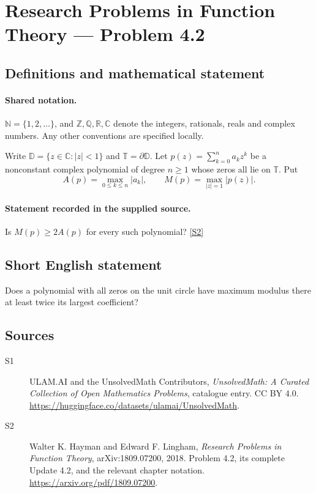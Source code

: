 \documentclass[11pt]{book}
\newcommand{\sref}[2]{\hyperlink{source:#1:#2}{[S#2]}}
\begin{document}
\section{Research Problems in Function Theory — Problem 4.2}\label{statement}

\subsection{Definitions and mathematical statement}

\paragraph{Shared notation.}$\mathbb N=\{1,2,\ldots\}$, and $\mathbb Z,\mathbb Q,\mathbb R,\mathbb C$ denote the integers, rationals, reals and complex numbers. Any other conventions are specified locally.


Write $\mathbb D=\{z\in\mathbb C:|z|<1\}$ and $\mathbb T=\partial\mathbb D$. Let $p(z)=\sum_{k=0}^na_kz^k$ be a nonconstant complex polynomial of degree $n\ge1$ whose zeros all lie on $\mathbb T$. Put
\[A(p)=\max_{0\le k\le n}|a_k|,\qquad M(p)=\max_{|z|=1}|p(z)|.
\]
\paragraph{Statement recorded in the supplied source.}
Is $M(p)\ge2A(p)$ for every such polynomial? \sref{statement}{2}
\subsection{Short English statement}
Does a polynomial with all zeros on the unit circle have maximum modulus there at least twice its largest coefficient?
\subsection{Sources}
\begin{description}
\item[\hypertarget{source:statement:1}{S1}] ULAM.AI and the UnsolvedMath Contributors, \emph{UnsolvedMath: A Curated Collection of Open Mathematics Problems}, catalogue entry. CC BY 4.0. \url{https://huggingface.co/datasets/ulamai/UnsolvedMath}.
\item[\hypertarget{source:statement:2}{S2}] Walter K. Hayman and Edward F. Lingham, \emph{Research Problems in Function Theory}, arXiv:1809.07200, 2018. Problem 4.2, its complete Update 4.2, and the relevant chapter notation. \url{https://arxiv.org/pdf/1809.07200}.
\end{description}
\label{end:statement}
\end{document}
